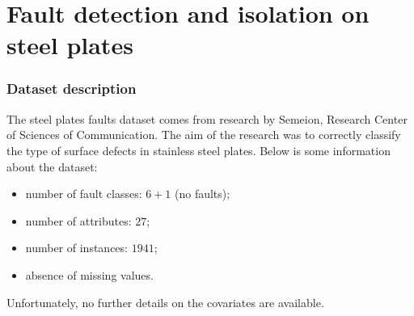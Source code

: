 \section{Fault detection and isolation on steel plates}

\begin{frame}
	\frametitle{Dataset description}
	The steel plates faults dataset comes from research by Semeion, Research Center of Sciences of Communication. The aim of the research was to correctly classify the type of surface defects in stainless steel plates. Below is some information about the dataset:
	\begin{itemize}
		\item number of fault classes: $6 + 1$ (no faults);
		\item number of attributes: $27$;
		\item number of instances: $1941$;
		\item absence of missing values.
	\end{itemize}
	Unfortunately, no further details on the covariates are available.
\end{frame}